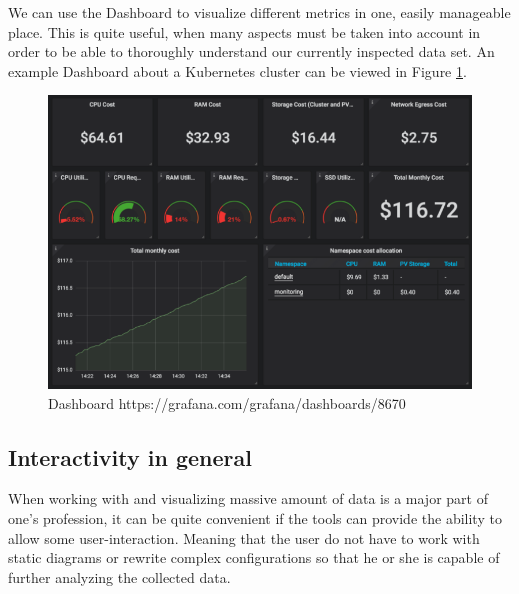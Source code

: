 We can use the Dashboard to visualize different metrics in one, easily manageable place. This is quite useful, when many aspects must be taken into account in order to be able to thoroughly understand our currently inspected data set. An example Dashboard about a Kubernetes cluster can be viewed in Figure \ref{fig:dashboard}.


\begin{figure}[H]
	\centering
	\includegraphics[width=130mm, keepaspectratio]{figures/dashboard-small.png}
	\caption{Dashboard https://grafana.com/grafana/dashboards/8670}
	\label{fig:dashboard}
\end{figure}

\subsection{Interactivity in general}
When working with and visualizing massive amount of data is a major part of one's profession, it can be quite convenient if the tools can provide the ability to allow some user-interaction. Meaning that the user do not have to work with static diagrams or rewrite complex configurations so that he or she is capable of further analyzing the collected data.

